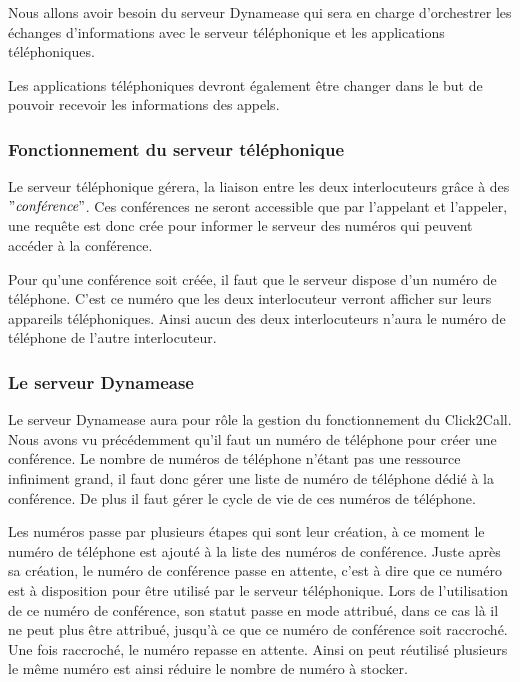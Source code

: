 Nous allons avoir besoin du serveur Dynamease qui sera en charge d'orchestrer les échanges d'informations avec le serveur téléphonique et les applications téléphoniques.

Les applications téléphoniques devront également être changer dans le but de pouvoir recevoir les informations des appels.

\subsubsection{Fonctionnement du serveur téléphonique}

Le serveur téléphonique gérera, la liaison entre les deux interlocuteurs grâce à des $"\textit{conférence}"$. Ces conférences ne seront accessible que par l'appelant et l'appeler, une requête est donc crée pour informer le serveur des numéros qui peuvent accéder à la conférence.

Pour qu'une conférence soit créée, il faut que le serveur dispose d'un numéro de téléphone. C'est ce numéro que les deux interlocuteur verront afficher sur leurs appareils téléphoniques. Ainsi aucun des deux interlocuteurs n'aura le numéro de téléphone de l'autre interlocuteur.

\subsubsection{Le serveur Dynamease}

Le serveur Dynamease aura pour rôle la gestion du fonctionnement du Click2Call. Nous avons vu précédemment qu'il faut un numéro de téléphone pour créer une conférence. Le nombre de numéros de téléphone n'étant pas une ressource infiniment grand, il faut donc gérer une liste de numéro de téléphone dédié à la conférence. De plus il faut gérer le cycle de vie de ces numéros de téléphone.

Les numéros passe par plusieurs étapes qui sont leur création, à ce moment le numéro de téléphone est ajouté à la liste des numéros de conférence. Juste après sa création, le numéro de conférence passe en attente, c'est à dire que ce numéro est à disposition pour être utilisé par le serveur téléphonique. Lors de l'utilisation de ce numéro de conférence, son statut passe en mode attribué, dans ce cas là il ne peut plus être attribué, jusqu'à ce que ce numéro de conférence soit raccroché. Une fois raccroché, le numéro repasse en attente. Ainsi on peut réutilisé plusieurs le même numéro est ainsi réduire le nombre de numéro à stocker.

